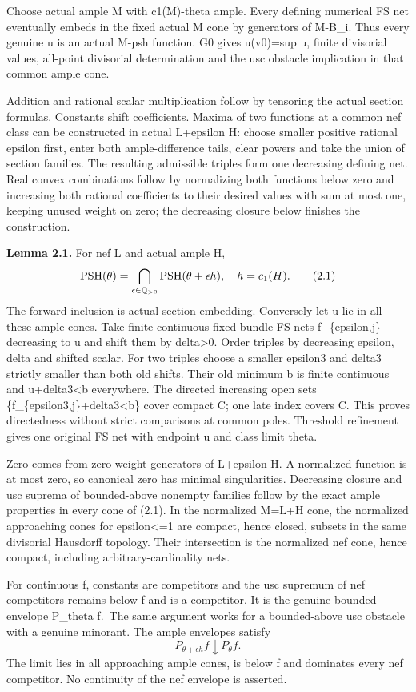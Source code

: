 \documentclass[
  10pt,
]{article}
\begin{document}
Choose actual ample M with c1(M)-theta ample. Every defining numerical
FS net eventually embeds in the fixed actual M cone by generators of
M-B\_i. Thus every genuine u is an actual M-psh function. G0 gives
u(v0)=sup u, finite divisorial values, all-point divisorial
determination and the usc obstacle implication in that common ample
cone.

Addition and rational scalar multiplication follow by tensoring the
actual section formulas. Constants shift coefficients. Maxima of two
functions at a common nef class can be constructed in actual L+epsilon
H: choose smaller positive rational epsilon first, enter both
ample-difference tails, clear powers and take the union of section
families. The resulting admissible triples form one decreasing defining
net. Real convex combinations follow by normalizing both functions below
zero and increasing both rational coefficients to their desired values
with sum at most one, keeping unused weight on zero; the decreasing
closure below finishes the construction.

\textbf{Lemma 2.1.} For nef L and actual ample H, \[
 {\rm PSH}(\theta)=\bigcap_{\epsilon\in\mathbb Q_{>0}}{\rm PSH}(\theta+\epsilon h),\quad h=c_1(H). \tag{2.1}
\] The forward inclusion is actual section embedding. Conversely let u
lie in all these ample cones. Take finite continuous fixed-bundle FS
nets f\_\{epsilon,j\} decreasing to u and shift them by
delta\textgreater0. Order triples by decreasing epsilon, delta and
shifted scalar. For two triples choose a smaller epsilon3 and delta3
strictly smaller than both old shifts. Their old minimum b is finite
continuous and u+delta3\textless b everywhere. The directed increasing
open sets \{f\_\{epsilon3,j\}+delta3\textless b\} cover compact C; one
late index covers C. This proves directedness without strict comparisons
at common poles. Threshold refinement gives one original FS net with
endpoint u and class limit theta.

Zero comes from zero-weight generators of L+epsilon H. A normalized
function is at most zero, so canonical zero has minimal singularities.
Decreasing closure and usc suprema of bounded-above nonempty families
follow by the exact ample properties in every cone of (2.1). In the
normalized M=L+H cone, the normalized approaching cones for
epsilon\textless=1 are compact, hence closed, subsets in the same
divisorial Hausdorff topology. Their intersection is the normalized nef
cone, hence compact, including arbitrary-cardinality nets.

For continuous f, constants are competitors and the usc supremum of nef
competitors remains below f and is a competitor. It is the genuine
bounded envelope P\_theta f.~The same argument works for a bounded-above
usc obstacle with a genuine minorant. The ample envelopes satisfy \[
 P_{\theta+\epsilon h}f\downarrow P_\theta f.                            \tag{2.2}
\] The limit lies in all approaching ample cones, is below f and
dominates every nef competitor. No continuity of the nef envelope is
asserted.
\end{document}
